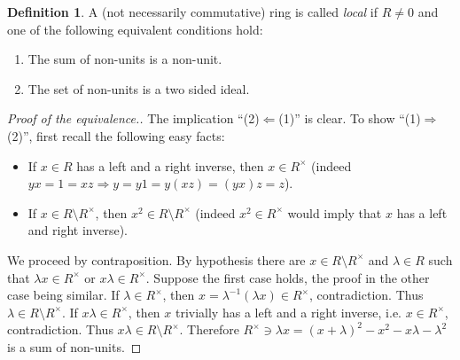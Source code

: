 \documentclass[12pt,a4paper]{report}
\theoremstyle{definition}
\newtheorem{defn}[theorem]{Definition}
\theoremstyle{num.custom-title}
\DeclareMathOperator{\imp}{\Rightarrow}
\DeclareMathOperator{\pmi}{\Leftarrow}
\DeclareMathOperator{\sm}{\setminus}
\begin{document}
\begin{defn}
A (not necessarily commutative) ring is called \emph{local} if $R \neq 0$ and one of the following equivalent conditions hold:
\begin{enumerate}
\item The sum of non-units is a non-unit.
\item The set of non-units is a two sided ideal.
\end{enumerate}
\begin{proof}[Proof of the equivalence.]
The implication ``(2)$\pmi$(1)'' is clear. To show ``(1)$\imp$(2)'', first recall the following easy facts:
\begin{itemize}
\item If $x \in R$ has a left and a right inverse, then $x \in R^\times$ (indeed $yx=1=xz \imp y=y1=y(xz)=(yx)z=z$).
\item If $x \in R \sm R^\times$, then $x^2 \in R \sm R^\times$ (indeed $x^2 \in R^\times$ would imply that $x$ has a left and right inverse).
\end{itemize}
We proceed by contraposition. By hypothesis there are $x \in R \sm R^\times$ and $\lambda \in R$ such that $\lambda x \in R^\times$ or $x \lambda \in R^\times$. Suppose the first case holds, the proof in the other case being similar. If $\lambda \in R^\times$, then $x = \lambda^{-1} (\lambda x) \in R^\times$, contradiction. Thus $\lambda \in R \sm R^\times$. If $x \lambda \in R^\times$, then $x$ trivially has a left and a right inverse, i.e. $x \in R^\times$, contradiction. Thus $x \lambda \in R \sm R^\times$. Therefore $R^\times \ni \lambda x = (x+\lambda)^2-x^2-x\lambda-\lambda^2$ is a sum of non-units.
\end{proof}
\end{defn}
\end{document}
